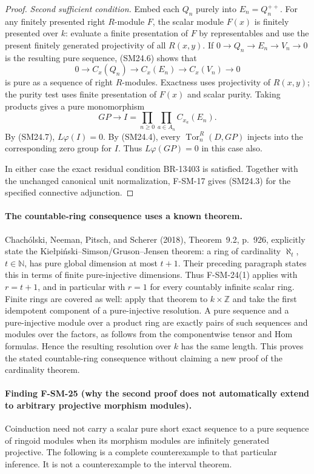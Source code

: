 \begin{proof}
\emph{Second sufficient condition.}
Embed each $Q_n$ purely into $E_n=Q_n^{++}$.
For any finitely presented right $R$-module $F$, the scalar
module $F(x)$ is finitely presented over $k$: evaluate a finite
presentation of $F$ by representables and use the present
finitely generated projectivity of all $R(x,y)$.
If $0\to Q_n\to E_n\to V_n\to0$ is the resulting pure sequence,
(SM24.6) shows that
\[
 0\to C_x(Q_n)\to C_x(E_n)\to C_x(V_n)\to0
\]
is pure as a sequence of right $R$-modules. Exactness uses
projectivity of $R(x,y)$; the purity test uses finite presentation
of $F(x)$ and scalar purity.
Taking products gives a pure monomorphism
\[
 GP\longrightarrow I=
       \prod_{n\geq0}\prod_{a\in A_n}C_{x_a}(E_n).
\]
By (SM24.7), $L\varphi(I)=0$.
By (SM24.4), every $\operatorname{Tor}_n^R(D,GP)$ injects
into the corresponding zero group for $I$.
Thus $L\varphi(GP)=0$ in this case also.

In either case the exact residual condition BR-13403 is satisfied.
Together with the unchanged canonical unit normalization,
F-SM-17 gives (SM24.3) for the specified connective adjunction.
\end{proof}

\paragraph{The countable-ring consequence uses a known theorem.}
Chach\'olski, Neeman, Pitsch, and Scherer (2018),
Theorem~9.2, p.~926, explicitly state the
Kie{\l}pi\'nski--Simson/Gruson--Jensen theorem:
a ring of cardinality $\aleph_t$, $t\in\mathbb N$, has pure
global dimension at most $t+1$. Their preceding paragraph
states this in terms of finite pure-injective dimensions.
Thus F-SM-24(1) applies with $r=t+1$, and in particular with
$r=1$ for every countably infinite scalar ring.
Finite rings are covered as well: apply that theorem to
$k\times\mathbb Z$ and take the first idempotent component of
a pure-injective resolution. A pure sequence and a pure-injective
module over a product ring are exactly pairs of such sequences
and modules over the factors, as follows from the componentwise
tensor and Hom formulas. Hence the resulting resolution over
$k$ has the same length. This proves the stated countable-ring
consequence without claiming a new proof of the cardinality theorem.

\paragraph{Finding F-SM-25 (why the second proof does not automatically extend to arbitrary projective morphism modules).}
Coinduction need not carry a scalar pure short exact sequence to a
pure sequence of ringoid modules when its morphism modules are
infinitely generated projective. The following is a complete
counterexample to that particular inference. It is not a
counterexample to the interval theorem.

